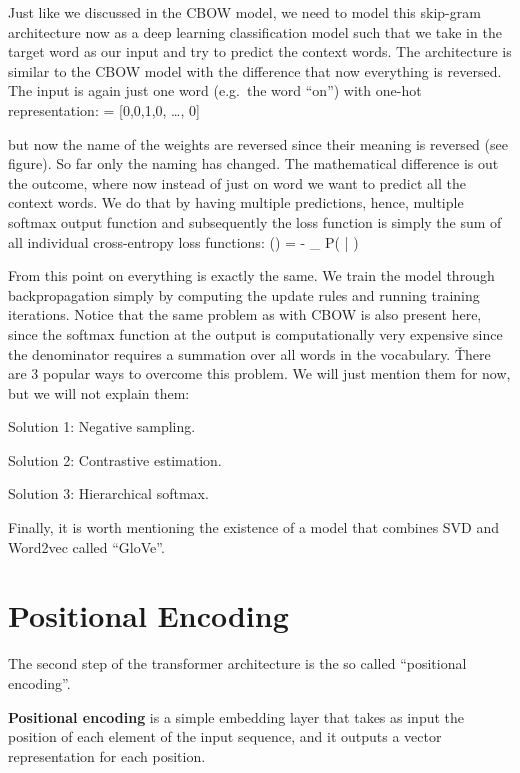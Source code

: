 Just like we discussed in the CBOW model, we need to model this skip-gram architecture now as a deep learning
classification model such that we take in the target word as our input and try to predict the context words. The
architecture is similar to the CBOW model with the difference that now everything is reversed. The input is again
just one word (e.g.\ the word ``on'') with one-hot representation:
\bse
{} = [0,0,1,0, \ldots, 0]
\ese

but now the name of the weights are reversed since their meaning is reversed (see figure). So far only the naming has
changed. The mathematical difference is out the outcome, where now instead of just on word we want to predict all the
context words. We do that by having multiple predictions, hence, multiple softmax output function and subsequently the
loss function is simply the sum of all individual cross-entropy loss functions:
\bse
{}(\theta) = - \sum_{} \ln P( | )
\ese

From this point on everything is exactly the same. We train the model through backpropagation simply by computing the
update rules and running training iterations. Notice that the same problem as with CBOW is also present here, since
the softmax function at the output is computationally very expensive since the denominator requires a summation over
all words in the vocabulary. \v

There are 3 popular ways to overcome this problem. We will just mention them for now, but we will not explain them:
\bit
\item Solution 1: Negative sampling.
\item Solution 2: Contrastive estimation.
\item Solution 3: Hierarchical softmax.
\eit

Finally, it is worth mentioning the existence of a model that combines SVD and Word2vec called ``GloVe''.

\section{Positional Encoding}


The second step of the transformer architecture is the so called ``positional encoding''.

\textbf{Positional encoding} is a simple embedding layer that takes as input the position of each element of the
input sequence, and it outputs a vector representation for each position.
\ed

